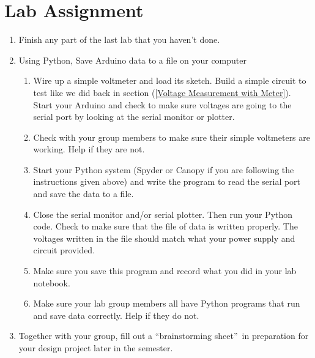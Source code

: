 \section{Lab Assignment}

\begin{enumerate}
\item Finish any part of the last lab that you haven't done.

\item Using Python, Save Arduino data to a file on your computer

	\begin{enumerate}
	\item Wire up a simple voltmeter and load its sketch. Build a simple circuit
	to test like we did back in section (\ref{Voltage Measurement with Meter}).
	Start your Arduino and check to make sure voltages are going to the serial
	port by looking at the serial monitor or plotter.
	
	\item Check with your group members to make sure their simple voltmeters are
	working. Help if they are not.
	
	\item Start your Python system (Spyder or Canopy if you are following the
	instructions given above) and write the program to read the serial port and
	save the data to a file.
	
	\item Close the serial monitor and/or serial plotter. Then run your Python
	code. Check to make sure that the file of data is written properly. The
	voltages written in the file should match what your power supply and circuit
	provided.
	
	\item Make sure you save this program and record what you did in your lab
	notebook.
	
	\item Make sure your lab group members all have Python programs that run and
	save data correctly. Help if they do not.
	\end{enumerate}

\item Together with your group, fill out a \textquotedblleft brainstorming
sheet\textquotedblright\ in preparation for your design project later in the
semester.


\end{enumerate}
